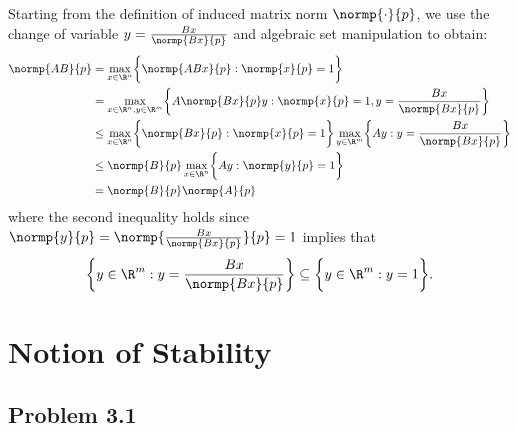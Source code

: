 \documentclass{homework}
\begin{document}
Starting from the definition of induced matrix norm $\normp{\cdot}{p}$,
we use the change of variable $y = \frac{Bx}{\normp{Bx}{p}}$
and algebraic set manipulation to obtain:
\begin{align*}
    \normp{AB}{p} &= \bmax{x\in\R^n}{
        \normp{ABx}{p}: \normp{x}{p} = 1
    } \\
    &= \bmax{x\in\R^n, y\in\R^m}{
        A\normp{Bx}{p} y : \normp{x}{p} = 1, y = \frac{Bx}{\normp{Bx}{p}}
    } \\
    &\leq \bmax{x\in\R^n}{\normp{Bx}{p}: \normp{x}{p} = 1}
        \bmax{y\in\R^m}{Ay : y = \frac{Bx}{\normp{Bx}{p}}} \\
    &\leq \normp{B}{p}
        \bmax{x\in\R^n}{Ay : \normp{y}{p} = 1} \\
    &= \normp{B}{p}\normp{A}{p}
\end{align*}
where the second inequality holds since
$\normp{y}{p} = \normp{\frac{Bx}{\normp{Bx}{p}}}{p} = 1$
implies that
\begin{equation}
    \biggl\{y\in\R^m: y = \frac{Bx}{\normp{Bx}{p}}\biggr\} \subseteq
    \biggl\{y\in\R^m: y = 1\biggr\}.
\end{equation}

\section{Notion of Stability}
\subsection{Problem 3.1}
\end{document}
